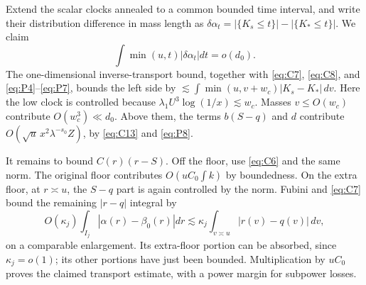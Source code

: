 Extend the scalar clocks annealed to a common bounded time interval,
and write their distribution difference in mass length as
\(\delta\alpha_t=|\{K_s\le t\}|-|\{K_*\le t\}|\). We claim
\[
 \int \min(u,t)|\delta\alpha_t|dt=o(d_0).
\]
The one-dimensional inverse-transport bound, together with
\eqref{eq:C7}, \eqref{eq:C8}, and \eqref{eq:P4}--\eqref{eq:P7},
bounds the left side by
\(\lesssim\int\min(u,v+w_c)|K_s-K_*|\,dv\).
Here the low clock is controlled because
\(\lambda_1U^3\log(1/x)\lesssim w_c\).
Masses \(v\le O(w_c)\) contribute \(O(w_c^3)\ll d_0\).
Above them, the terms \(b(S-q)\) and \(d\) contribute
\(O(\sqrt u\,x^2\lambda^{-s_0}Z)\), by \eqref{eq:C13} and
\eqref{eq:P8}.

It remains to bound \(C(r)(r-S)\). Off the floor, use
\eqref{eq:C6} and the same norm. The original floor contributes
\(O(uC_0\int k)\) by boundedness. On the extra floor, at
\(r\asymp u\), the \(S-q\) part is again controlled by the norm.
Fubini and \eqref{eq:C7} bound the remaining \(|r-q|\) integral by
\[
 O(\kappa_j)\int_{I_j}|\alpha(r)-\beta_0(r)|dr
 \lesssim \kappa_j\int_{v\asymp u}|r(v)-q(v)|\,dv ,
\]
on a comparable enlargement. Its extra-floor portion can be absorbed,
since \(\kappa_j=o(1)\); its other portions have just been bounded.
Multiplication by \(uC_0\) proves the claimed transport estimate,
with a power margin for subpower losses.


